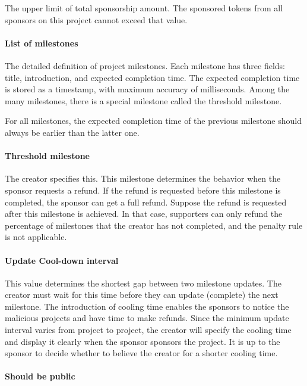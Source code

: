 \documentclass[12pt,a4paper]{article}
\begin{document}
    The upper limit of total sponsorship amount.
    The sponsored tokens from all sponsors on this project cannot exceed that value.

    \paragraph{List of milestones}

    The detailed definition of project milestones.
    Each milestone has three fields: title, introduction, and expected completion
    time.
    The expected completion time is stored as a timestamp, with maximum accuracy
    of milliseconds.
    Among the many milestones, there is a special milestone called the threshold
    milestone.

    For all milestones, the expected completion time of the previous milestone
    should always be earlier than the latter one.

    \paragraph{Threshold milestone}

    The creator specifies this.
    This milestone determines the behavior when the sponsor requests a refund.
    If the refund is requested before this milestone is completed, the sponsor
    can get a full refund.
    Suppose the refund is requested after this milestone is achieved.
    In that case, supporters can only refund the percentage of milestones that
    the creator has not completed, and the penalty rule is not applicable.

    \paragraph{Update Cool-down interval}

    This value determines the shortest gap between two milestone updates.
    The creator must wait for this time before they can update (complete) the
    next milestone.
    The introduction of cooling time enables the sponsors to notice the malicious
    projects and have time to make refunds.
    Since the minimum update interval varies from project to project, the creator
    will specify the cooling time and display it clearly when the sponsor sponsors
    the project.
    It is up to the sponsor to decide whether to believe the creator for a shorter
    cooling time.

    \paragraph{Should be public}
\end{document}
